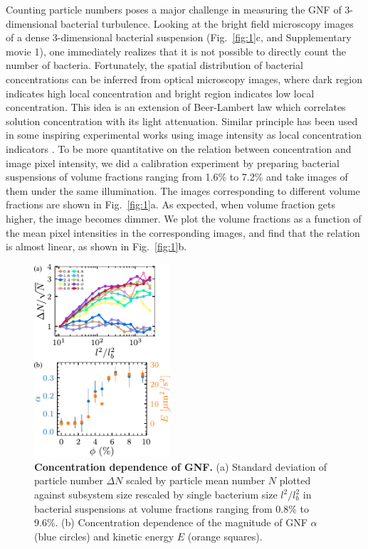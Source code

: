 \documentclass[twocolumn,aps,prl,amsmath,amssymb,longbibliography]{revtex4-2}
\begin{document}
Counting particle numbers poses a major challenge in measuring the GNF of 3-dimensional bacterial turbulence. Looking at the bright field microscopy images of a dense 3-dimensional bacterial suspension (Fig.~\ref{fig:1}c, and Supplementary movie 1), one immediately realizes that it is not possible to directly count the number of bacteria. Fortunately, the spatial distribution of bacterial concentrations can be inferred from optical microscopy images, where dark region indicates high local concentration and bright region indicates low local concentration. This idea is an extension of Beer-Lambert law which correlates solution concentration with its light attenuation. Similar principle has been used in some inspiring experimental works using image intensity as local concentration indicators \cite{Wilson2011, Schaller2013}. To be more quantitative on the relation between concentration and image pixel intensity, we did a calibration experiment by preparing bacterial suspensions of volume fractions ranging from 1.6\% to 7.2\% and take images of them under the same illumination. The images corresponding to different volume fractions are shown in Fig.~\ref{fig:1}a. As expected, when volume fraction gets higher, the image becomes dimmer. We plot the volume fractions as a function of the mean pixel intensities in the corresponding images, and find that the relation is almost linear, as shown in Fig.~\ref{fig:1}b.




\begin{figure}[ht]
\begin{center}
\includegraphics[width=0.45\textwidth]{figures/fig-3/v5.pdf}
\caption[Concentration dependence of GNF.]
{
\textbf{Concentration dependence of GNF.}
(a) Standard deviation of particle number $\Delta N$ scaled by particle mean number $N$ plotted against subsystem size rescaled by single bacterium size $l^2/l_b^2$ in bacterial suspensions at volume fractions ranging from 0.8\% to 9.6\%.
(b) Concentration dependence of the magnitude of GNF $\alpha$ (blue circles) and kinetic energy $E$ (orange squares).
}
\label{concentration-dependence}
\end{center}
\end{figure}
\end{document}
